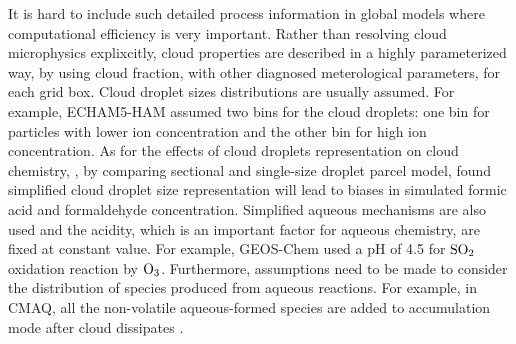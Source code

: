 \documentclass[edeposit,fullpage]{uiucthesis2009}
\begin{document}
It is hard to include such detailed process information in global
models where computational efficiency is very important. Rather than
resolving cloud microphysics explixcitly, cloud properties are
described in a highly parameterized way, by using cloud fraction, with
other diagnosed meterological parameters, for each grid box. Cloud
droplet sizes distributions are usually assumed. For example,
ECHAM5-HAM assumed two bins for the cloud droplets: one bin for
particles with lower ion concentration and the other bin for high ion
concentration. As for the effects of cloud droplets representation on
cloud chemistry, \citet{barth2006importance}, by comparing sectional
and single-size droplet parcel model, found simplified cloud droplet
size representation will lead to biases in simulated formic acid and
formaldehyde concentration. Simplified aqueous mechanisms are also
used and the acidity, which is an important factor for aqueous
chemistry, are fixed at constant value. For example, GEOS-Chem used a
pH of 4.5 for $\rm SO_2$ oxidation reaction by $\rm
O_3$\citep{park2004natural}. Furthermore, assumptions need to be made
to consider the distribution of species produced from aqueous
reactions. For example, in CMAQ, all the non-volatile aqueous-formed
species are added to accumulation mode after cloud dissipates
\citep{binkowski2003models, fahey2017framework}.
 
\end{document}
